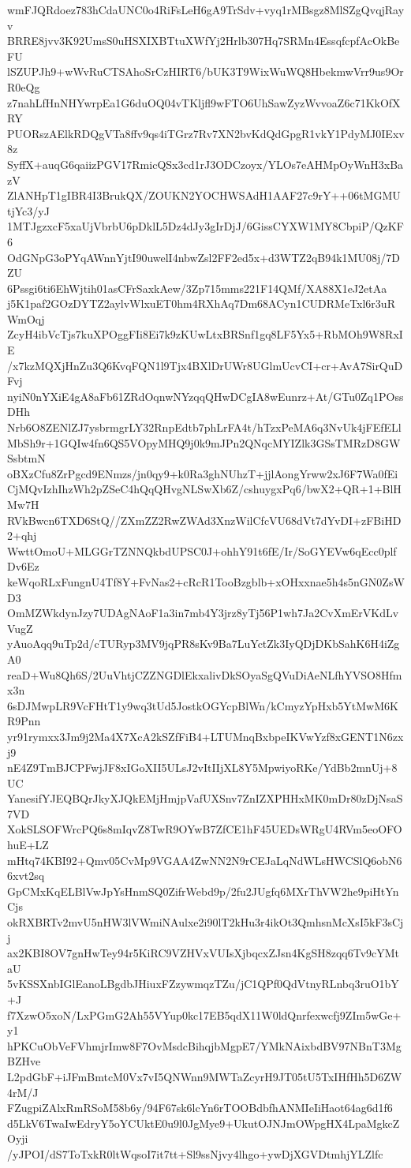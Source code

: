wmFJQRdoez783hCdaUNC0o4RiFsLeH6gA9TrSdv+vyq1rMBsgz8MlSZgQvqjRayv
BRRE8jvv3K92UmsS0uHSXIXBTtuXWfYj2Hrlb307Hq7SRMn4EssqfcpfAcOkBeFU
lSZUPJh9+wWvRuCTSAhoSrCzHIRT6/bUK3T9WixWuWQ8HbekmwVrr9us9OrR0eQg
z7nahLfHnNHYwrpEa1G6duOQ04vTKljfl9wFTO6UhSawZyzWvvoaZ6c71KkOfXRY
PUORszAElkRDQgVTa8ffv9qs4iTGrz7Rv7XN2bvKdQdGpgR1vkY1PdyMJ0IExv8z
SyffX+auqG6qaiizPGV17RmicQSx3cd1rJ3ODCzoyx/YLOs7eAHMpOyWnH3xBazV
ZlANHpT1gIBR4I3BrukQX/ZOUKN2YOCHWSAdH1AAF27c9rY++06tMGMUtjYc3/yJ
1MTJgzxcF5xaUjVbrbU6pDklL5Dz4dJy3gIrDjJ/6GissCYXW1MY8CbpiP/QzKF6
OdGNpG3oPYqAWnnYjtI90uwelI4nbwZsl2FF2ed5x+d3WTZ2qB94k1MU08j/7DZU
6Pssgi6ti6EhWjtih01asCFrSaxkAew/3Zp715mms221F14QMf/XA88X1eJ2etAa
j5K1paf2GOzDYTZ2aylvWlxuET0hm4RXhAq7Dm68ACyn1CUDRMeTxl6r3uRWmOqj
ZcyH4ibVcTjs7kuXPOggFIi8Ei7k9zKUwLtxBRSnf1gq8LF5Yx5+RbMOh9W8RxIE
/x7kzMQXjHnZu3Q6KvqFQN1l9Tjx4BXlDrUWr8UGlmUcvCI+cr+AvA7SirQuDFvj
nyiN0nYXiE4gA8aFb61ZRdOqnwNYzqqQHwDCgIA8wEunrz+At/GTu0Zq1POssDHh
Nrb6O8ZENlZJ7ysbrmgrLY32RnpEdtb7phLrFA4t/hTzxPeMA6q3NvUk4jFEfELl
MbSh9r+1GQIw4fn6QS5VOpyMHQ9j0k9mJPn2QNqcMYIZlk3GSsTMRzD8GWSsbtmN
oBXzCfu8ZrPgcd9ENmzs/jn0qy9+k0Ra3ghNUhzT+jjlAongYrww2xJ6F7Wa0fEi
CjMQvIzhIhzWh2pZSeC4hQqQHvgNLSwXb6Z/cshuygxPq6/bwX2+QR+1+BlHMw7H
RVkBwcn6TXD6StQ//ZXmZZ2RwZWAd3XnzWilCfcVU68dVt7dYvDI+zFBiHD2+qhj
WwttOmoU+MLGGrTZNNQkbdUPSC0J+ohhY91t6fE/Ir/SoGYEVw6qEcc0plfDv6Ez
keWqoRLxFungnU4Tf8Y+FvNas2+cRcR1TooBzgblb+xOHxxnae5h4s5nGN0ZsWD3
OmMZWkdynJzy7UDAgNAoF1a3in7mb4Y3jrz8yTj56P1wh7Ja2CvXmErVKdLvVugZ
yAuoAqq9uTp2d/cTURyp3MV9jqPR8sKv9Ba7LuYctZk3IyQDjDKbSahK6H4iZgA0
reaD+Wu8Qh6S/2UuVhtjCZZNGDlEkxalivDkSOyaSgQVuDiAeNLfhYVSO8Hfmx3n
6sDJMwpLR9VcFHtT1y9wq3tUd5JostkOGYcpBlWn/kCmyzYpHxb5YtMwM6KR9Pnn
yr91rymxx3Jm9j2Ma4X7XcA2kSZfFiB4+LTUMnqBxbpeIKVwYzf8xGENT1N6zxj9
nE4Z9TmBJCPFwjJF8xIGoXII5ULsJ2vItIIjXL8Y5MpwiyoRKe/YdBb2mnUj+8UC
YanesifYJEQBQrJkyXJQkEMjHmjpVafUXSnv7ZnIZXPHHxMK0mDr80zDjNsaS7VD
XokSLSOFWrcPQ6s8mIqvZ8TwR9OYwB7ZfCE1hF45UEDsWRgU4RVm5eoOFOhuE+LZ
mHtq74KBI92+Qmv05CvMp9VGAA4ZwNN2N9rCEJaLqNdWLsHWCSlQ6obN66xvt2sq
GpCMxKqELBlVwJpYsHnmSQ0ZifrWebd9p/2fu2JUgfq6MXrThVW2he9piHtYnCjs
okRXBRTv2mvU5nHW3lVWmiNAulxe2i90lT2kHu3r4ikOt3QmhsnMcXsI5kF3sCjj
ax2KBI8OV7gnHwTey94r5KiRC9VZHVxVUIsXjbqcxZJsn4KgSH8zqq6Tv9cYMtaU
5vKSSXnbIGlEanoLBgdbJHiuxFZzywmqzTZu/jC1QPf0QdVtnyRLnbq3ruO1bY+J
f7XzwO5xoN/LxPGmG2Ah55VYup0kc17EB5qdX11W0ldQnrfexwcfj9ZIm5wGe+y1
hPKCuObVeFVhmjrImw8F7OvMsdcBihqjbMgpE7/YMkNAixbdBV97NBnT3MgBZHve
L2pdGbF+iJFmBmtcM0Vx7vI5QNWnn9MWTaZcyrH9JT05tU5TxIHfHh5D6ZW4rM/J
FZugpiZAlxRmRSoM58b6y/94F67sk6lcYn6rTOOBdbfhANMIeIiHaot64ag6d1f6
d5LkV6TwaIwEdryY5oYCUktE0u9l0JgMye9+UkutOJNJmOWpgHX4LpaMgkcZOyji
/yJPOI/dS7ToTxkR0ltWqsoI7it7tt+Sl9ssNjvy4lhgo+ywDjXGVDtmhjYLZlfc
